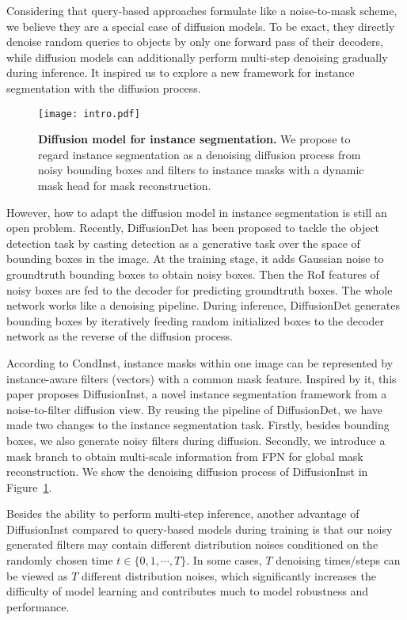 \documentclass{article}
\begin{document}
Considering that query-based approaches\cite{Mask2Former,QueryInst} formulate like a noise-to-mask scheme, we believe they are a special case of diffusion models\cite{DDPM,SGM,GMDD}. To be exact, they directly denoise random queries to objects by only one forward pass of their decoders, while diffusion models can additionally perform multi-step denoising gradually during inference. It inspired us to explore a new framework for instance segmentation with the diffusion process.

\begin{figure}[t]
\centering
\texttt{[image: intro.pdf]}
\caption{\textbf{Diffusion model for instance segmentation.} We propose to regard instance segmentation as a denoising diffusion process from noisy 
bounding boxes and filters to instance masks with a dynamic mask head for mask reconstruction.}
\label{intro}
\end{figure}

However, how to adapt the diffusion model in instance segmentation is still an open problem. Recently, DiffusionDet\cite{DiffusionDet} has been proposed to tackle the object detection task by casting detection as a generative task over the space of bounding boxes in the image. At the training stage, it adds Gaussian noise to groundtruth bounding boxes to obtain noisy boxes. Then the RoI features of noisy boxes are fed to the decoder for predicting groundtruth boxes. The whole network works like a denoising pipeline. During inference, DiffusionDet generates bounding boxes by iteratively feeding random initialized boxes to the decoder network as the reverse of the diffusion process. 

According to CondInst\cite{CondInst}, instance masks within one image can be represented by instance-aware filters (vectors) with a common mask feature. Inspired by it, this paper proposes DiffusionInst, a novel instance segmentation framework from a noise-to-filter diffusion view. By reusing the pipeline of DiffusionDet, we have made two changes to the instance segmentation task. Firstly, besides bounding boxes, we also generate noisy filters during diffusion. Secondly, we introduce a mask branch to obtain multi-scale information from FPN\cite{FPN} for global mask reconstruction. We show the denoising diffusion process of DiffusionInst in Figure~\ref{intro}.

Besides the ability to perform multi-step inference, another advantage of DiffusionInst compared to query-based models during training is that our noisy generated filters may contain different distribution noises conditioned on the randomly chosen time $t\in \{0,1,\cdots,T\}$. In some cases, $T$ denoising times/steps can be viewed as $T$ different distribution noises, which significantly increases the difficulty of model learning and contributes much to model robustness and performance. 
\end{document}
